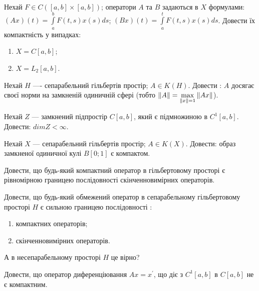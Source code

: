 \begin{exercise}
    Нехай $F \in C([a, b] \times [a, b])$; оператори $A$ та $B$ задаються в $X$ формулами:
    $(Ax)(t)=\int\limits_a^b F(t, s)x(s)ds$; $(Bx)(t) = \int\limits_a^t F(t, s)x(s)ds$.
    Довести їх компактність у випадках:
    \begin{enumerate}
        \item $X = C[a, b]$;
        \item $X = L_2[a, b]$.
    \end{enumerate}
\end{exercise}

\begin{exercise}
    Нехай $H$ ---- сепарабельний гільбертів простір; $A \in K(H)$. Довести : $A$ 
    досягає своєї норми на замкненій одиничній сфері (тобто $\left\lVert A\right\rVert = 
    \underset{\left\lVert x\right\rVert = 1}{\max}\left\lVert Ax\right\rVert$).
\end{exercise}

\begin{exercise}
    Нехай $Z$ --- замкнений підпростір $C[a, b]$, який є підмножиною в $C^1[a, b]$. 
    Довести: $dim Z < \infty$.
\end{exercise}

\begin{exercise}
    Нехай $X$ --- сепарабельний гільбертів простір; $A \in K(X)$. Довести: образ замкненої 
    одиничної кулі $B[0; 1]$ є компактом.
\end{exercise}

\begin{exercise}
    Довести, що будь-який компактний оператор в гільбертовому просторі є рівномірною 
    границею послідовності скінченновимірних операторів.
\end{exercise}

\begin{exercise}
    Довести, що будь-який обмежений оператор в сепарабельному гільбертовому просторі $H$ є 
    сильною границею послідовності :
    \begin{enumerate}
        \item компактних операторів;
        \item скінченновимірних операторів.
    \end{enumerate}
    А в несепарабельному просторі $H$ це вірно?
\end{exercise}

\begin{exercise}
    Довести, що оператор диференціювання $Ax = x^\prime$, що діє з $C^1[a, b]$ в $C[a, b]$ 
    не є компактним.
\end{exercise}